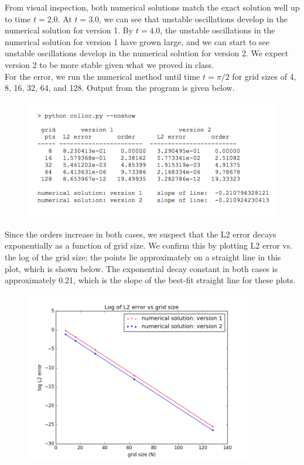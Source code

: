\documentclass[12pt]{article}
\begin{document}
From visual inspection, both numerical solutions match the exact solution well up to time $t = 2.0$. At $t = 3.0$, we can see that unstable oscillations develop in the numerical solution for version 1. By $t = 4.0$, the unstable oscillations in the numerical solution for version 1 have grown large, and we can start to see unstable oscillations develop in the numerical solution for version 2. We expect version 2 to be more stable given what we proved in class.\\

For the error, we run the numerical method until time $t = \pi/2$ for grid sizes of 4, 8, 16, 32, 64, and 128. Output from the program is given below.
\begin{figure}[H]
\includegraphics[width=15cm]{images/colloc-output.png}
\end{figure}

Since the orders increase in both cases, we suspect that the L2 error decays exponentially as a function of grid size. We confirm this by plotting L2 error vs. the log of the grid size; the points lie approximately on a straight line in this plot, which is shown below. The exponential decay constant in both cases is approximately 0.21, which is the slope of the best-fit straight line for these plots.
\begin{figure}[H]
\includegraphics[width=10cm]{images/1error.png}
\end{figure}
\end{document}
